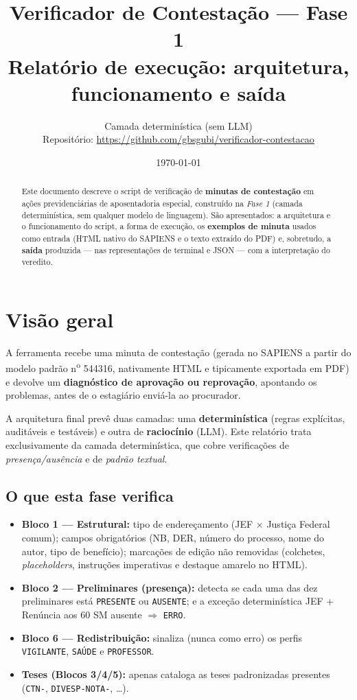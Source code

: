 \documentclass[11pt,a4paper]{article}
\title{\textbf{Verificador de Contestação --- Fase 1}\\[2mm]
\large Relatório de execução: arquitetura, funcionamento e saída}
\author{Camada determinística (sem LLM)\\
\small Repositório: \url{https://github.com/gbsgubi/verificador-contestacao}}
\date{\today}
\newcommand{\status}[1]{\texttt{#1}}
\begin{document}
\maketitle

\begin{abstract}
\noindent Este documento descreve o script de verificação de \textbf{minutas de
contestação} em ações previdenciárias de aposentadoria especial, construído na
\emph{Fase 1} (camada determinística, sem qualquer modelo de linguagem). São
apresentados: a arquitetura e o funcionamento do script, a forma de execução,
os \textbf{exemplos de minuta} usados como entrada (HTML nativo do SAPIENS e o
texto extraído do PDF) e, sobretudo, a \textbf{saída} produzida --- nas
representações de terminal e JSON --- com a interpretação do veredito.
\end{abstract}

\tableofcontents
\bigskip

\section{Visão geral}

A ferramenta recebe uma minuta de contestação (gerada no SAPIENS a partir do
modelo padrão n\textsuperscript{o} 544316, nativamente HTML e tipicamente
exportada em PDF) e devolve um \textbf{diagnóstico de aprovação ou reprovação},
apontando os problemas, antes de o estagiário enviá-la ao procurador.

A arquitetura final prevê duas camadas: uma \textbf{determinística} (regras
explícitas, auditáveis e testáveis) e outra de \textbf{raciocínio} (LLM). Este
relatório trata exclusivamente da camada determinística, que cobre verificações
de \emph{presença/ausência} e de \emph{padrão textual}.

\subsection{O que esta fase verifica}
\begin{itemize}[leftmargin=1.4em]
  \item \textbf{Bloco 1 --- Estrutural:} tipo de endereçamento (JEF
        $\times$ Justiça Federal comum); campos obrigatórios (NB, DER, número do
        processo, nome do autor, tipo de benefício); marcações de edição não
        removidas (colchetes, \emph{placeholders}, instruções imperativas e
        destaque amarelo no HTML).
  \item \textbf{Bloco 2 --- Preliminares (presença):} detecta se cada uma das
        dez preliminares está \status{PRESENTE} ou \status{AUSENTE}; e a exceção
        determinística JEF + Renúncia aos 60 SM ausente $\Rightarrow$
        \status{ERRO}.
  \item \textbf{Bloco 6 --- Redistribuição:} sinaliza (nunca como erro) os
        perfis \status{VIGILANTE}, \status{SAÚDE} e \status{PROFESSOR}.
  \item \textbf{Teses (Blocos 3/4/5):} apenas cataloga as teses padronizadas
        presentes (\texttt{CTN-}, \texttt{DIVESP-NOTA-}, \ldots).
\end{itemize}
\end{document}
